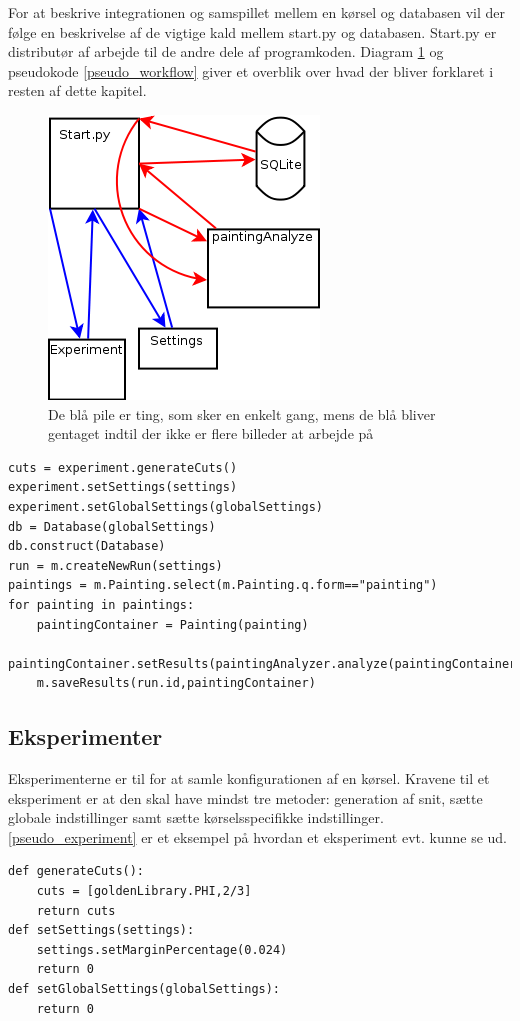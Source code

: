{
{\sffamily
For at beskrive integrationen og samspillet mellem en kørsel og
databasen vil der følge en beskrivelse af de vigtige kald mellem 
start.py og databasen. 
}
Start.py er distributør af arbejde til de andre dele af programkoden.
Diagram \ref{start_workflow} og pseudokode \ref{pseudo_workflow} giver et overblik over hvad der bliver
forklaret i resten af dette kapitel. 
\begin{figure}[h!]
	\begin{center}
		\includegraphics[scale=0.5]{afsnit/implementation/billeder/workflow_start_py.png}
	\end{center}
	\caption{De blå pile er ting, som sker en enkelt gang, mens de blå
	\label{start_workflow}
	bliver gentaget indtil der ikke er flere billeder at arbejde på}
\end{figure}
\begin{lstlisting}[caption={Pseudokode for
start},frame=tb,label={pseudo_workflow}]
cuts = experiment.generateCuts()
experiment.setSettings(settings)
experiment.setGlobalSettings(globalSettings)
db = Database(globalSettings)
db.construct(Database)
run = m.createNewRun(settings)
paintings = m.Painting.select(m.Painting.q.form=="painting")
for painting in paintings:
	paintingContainer = Painting(painting)
	paintingContainer.setResults(paintingAnalyzer.analyze(paintingContainer,settings))
	m.saveResults(run.id,paintingContainer)
\end{lstlisting}
\subsection{Eksperimenter}
Eksperimenterne er til for at samle konfigurationen af en kørsel.
Kravene til et eksperiment er at den skal have mindst tre metoder:
generation af snit, sætte globale indstillinger samt sætte
kørselsspecifikke indstillinger. \ref{pseudo_experiment} er et eksempel
på hvordan et eksperiment evt. kunne se ud.
\begin{lstlisting}[caption={Pseudokode for et
experiment, som checker på $\varPhi$},frame=tb,label={pseudo_experiment}]
def generateCuts():
	cuts = [goldenLibrary.PHI,2/3]
	return cuts
def setSettings(settings):
	settings.setMarginPercentage(0.024)
	return 0
def setGlobalSettings(globalSettings):
	return 0
\end{lstlisting}
}
